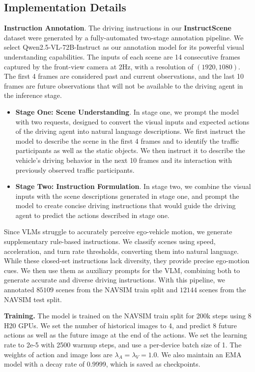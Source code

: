 \subsection{Implementation Details}
\label{sec: implementation}
\textbf{Instruction Annotation}.
The driving instructions in our \textbf{InstructScene} dataset were generated by a fully-automated two-stage annotation pipeline. We select Qwen2.5-VL-72B-Instruct \cite{qwen2_5} as our annotation model for its powerful visual understanding capabilities. The inputs of each scene are 14 consecutive frames captured by the front-view camera at 2Hz, with a resolution of $(1920, 1080)$. The first 4 frames are considered past and current observations, and the last 10 frames are future observations that will not be available to the driving agent in the inference stage. 
\begin{itemize}
    \item \textbf{Stage One: Scene Understanding}. In stage one, we prompt the model with two requests, designed to convert the visual inputs and expected actions of the driving agent into natural language descriptions. We first instruct the model to describe the scene in the first 4 frames and to identify the traffic participants as well as the static objects. We then instruct it to describe the vehicle's driving behavior in the next 10 frames and its interaction with previously observed traffic participants. 
    \item \textbf{Stage Two: Instruction Formulation}. In stage two, we combine the visual inputs with the scene descriptions generated in stage one, and prompt the model to create concise driving instructions that would guide the driving agent to predict the actions described in stage one. 
\end{itemize}
Since VLMs struggle to accurately perceive ego-vehicle motion, we generate supplementary rule-based instructions. We classify scenes using speed, acceleration, and turn rate thresholds, converting them into natural language. While these closed-set instructions lack diversity, they provide precise ego-motion cues. We then use them as auxiliary prompts for the VLM, combining both to generate accurate and diverse driving instructions. With this pipeline, we annotated $85109$ scenes from the NAVSIM train split and $12144$ scenes from the NAVSIM test split. 

\textbf{Training.}
The model is trained on the NAVSIM train split for 200k steps using 8 H20 GPUs. We set the number of historical images to 4, and predict 8 future actions as well as the future image at the end of the actions. We set the learning rate to 2e-5 with 2500 warmup steps, and use a per-device batch size of 1. The weights of action and image loss are $\lambda_A = \lambda_V =1.0$. We also maintain an EMA model with a decay rate of 0.9999, which is saved as checkpoints. 


